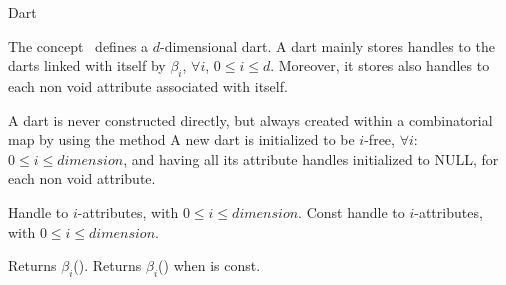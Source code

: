 \ccRefPageBegin
\begin{ccRefConcept}{Dart}

\ccDefinition
  
The concept \ccRefName\ defines a $d$-dimensional dart.  A dart mainly
stores handles to the darts linked with itself by $\beta_i$, $\forall
i$, $0 \leq i \leq d$. Moreover, it stores also handles to each
non void attribute associated with itself.


\ccCreation 
{} 
A dart  is never constructed directly, but always created
within a combinatorial map  by using the method
 A new dart is initialized to be $i$-free,
$\forall i$: $0 \leq i \leq dimension$, and having all its attribute
handles initialized to NULL, for each non void attribute.

\ccConstants
{}

\ccTypes
{}
%
\ccGlue
{}

    {Handle to $i$-attributes, with $0 \leq i \leq dimension$.}
\ccGlue
{}
    {Const handle to $i$-attributes, with $0 \leq i \leq dimension$.}

%
         {Returns $\beta_i$().
          }
\ccGlue
{}
         {Returns $\beta_i$() when  is const.
          }


\end{ccRefConcept}
